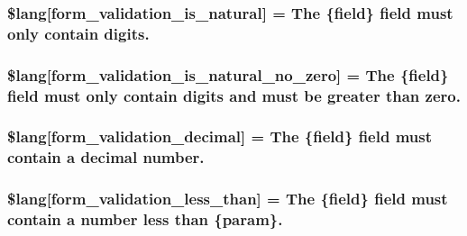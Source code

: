 \subsubsection[{\$lang}]{\setlength{\rightskip}{0pt plus 5cm}\$lang\mbox{[}\textquotesingle{}form\+\_\+validation\+\_\+is\+\_\+natural\textquotesingle{}\mbox{]} = \textquotesingle{}The \{field\} field must only contain digits.\textquotesingle{}}\label{form__validation__lang_8php_a10a669b7755f5eb6c4c0b5d8ad7af449}
\hypertarget{form__validation__lang_8php_a9cd7170707b93d47702698ff85d7ab9c}{}
\subsubsection[{\$lang}]{\setlength{\rightskip}{0pt plus 5cm}\$lang\mbox{[}\textquotesingle{}form\+\_\+validation\+\_\+is\+\_\+natural\+\_\+no\+\_\+zero\textquotesingle{}\mbox{]} = \textquotesingle{}The \{field\} field must only contain digits and must be greater than zero.\textquotesingle{}}\label{form__validation__lang_8php_a9cd7170707b93d47702698ff85d7ab9c}
\hypertarget{form__validation__lang_8php_aaa48b480326c914d9b8aa16cabdc11f7}{}
\subsubsection[{\$lang}]{\setlength{\rightskip}{0pt plus 5cm}\$lang\mbox{[}\textquotesingle{}form\+\_\+validation\+\_\+decimal\textquotesingle{}\mbox{]} = \textquotesingle{}The \{field\} field must contain {\bf a} decimal number.\textquotesingle{}}\label{form__validation__lang_8php_aaa48b480326c914d9b8aa16cabdc11f7}
\hypertarget{form__validation__lang_8php_aa3ee4ecc6cbaf35bf4708c7e8c2afcca}{}
\subsubsection[{\$lang}]{\setlength{\rightskip}{0pt plus 5cm}\$lang\mbox{[}\textquotesingle{}form\+\_\+validation\+\_\+less\+\_\+than\textquotesingle{}\mbox{]} = \textquotesingle{}The \{field\} field must contain {\bf a} number less than \{param\}.\textquotesingle{}}\label{form__validation__lang_8php_aa3ee4ecc6cbaf35bf4708c7e8c2afcca}
\hypertarget{form__validation__lang_8php_a687b3be07540d640e2b308086c855c83}{}
